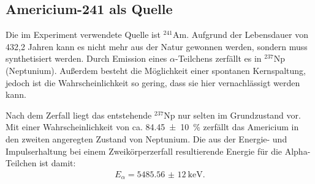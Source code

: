 \subsection{Americium-241 als Quelle}

Die im Experiment verwendete Quelle ist $^{241}$Am.
Aufgrund der Lebensdauer
von 432,2 Jahren kann es nicht mehr aus der Natur gewonnen werden, sondern muss synthetisiert werden.
Durch Emission eines $\alpha$-Teilchens zerfällt es in $^{237}$Np (Neptunium).
Außerdem besteht die Möglichkeit einer spontanen Kernspaltung, jedoch ist die Wahrscheinlichkeit so gering, dass sie hier vernachlässigt werden kann.

Nach dem Zerfall liegt das entstehende $^{237}$Np nur selten im Grundzustand vor.
Mit einer Wahrscheinlichkeit von ca. \SI{84,45(10)}{\percent} zerfällt das Americium in den zweiten angeregten Zustand von Neptunium.
Die aus der Energie- und Impulserhaltung bei einem Zweikörperzerfall resultierende Energie für die Alpha-Teilchen ist damit:
\begin{align*}
	E_\alpha = \SI{5485,56(12)}{\kilo\electronvolt}.
\end{align*}